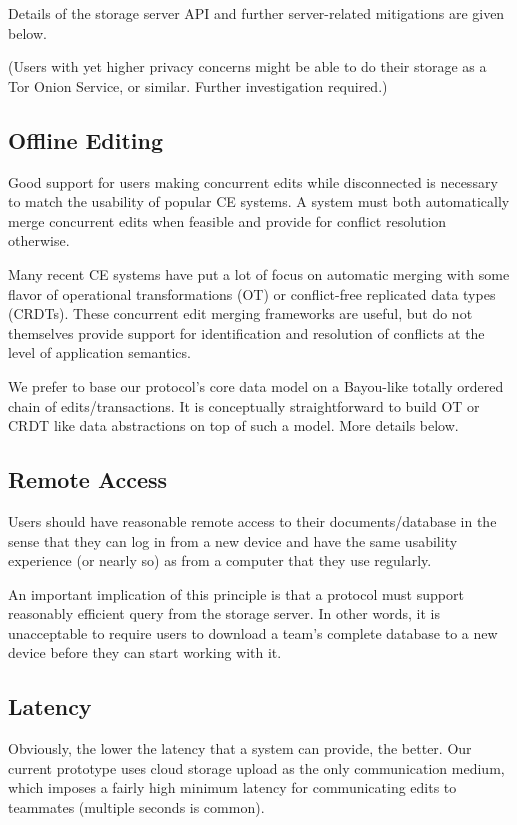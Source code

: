 \documentclass{article}
\begin{document}
Details of the storage server API and further server-related mitigations are given below.

(Users with yet higher privacy concerns might be able to do their storage as a Tor Onion Service, or similar.
Further investigation required.)

\subsection{Offline Editing}

Good support for users making concurrent edits while disconnected is necessary to match the usability of popular CE systems.
A system must both automatically merge concurrent edits when feasible and provide for conflict resolution otherwise.

Many recent CE systems have put a lot of focus on automatic merging with some flavor of operational transformations (OT) or conflict-free replicated data types (CRDTs).
These concurrent edit merging frameworks are useful, but do not themselves provide support for identification and resolution of conflicts at the level of application semantics.

We prefer to base our protocol's core data model on a Bayou-like totally ordered chain of edits/transactions.
It is conceptually straightforward to build OT or CRDT like data abstractions on top of such a model.
More details below.

\subsection{Remote Access}

Users should have reasonable remote access to their documents/database in the sense that they can log in from a new device and have the same usability experience (or nearly so) as from a computer that they use regularly.

An important implication of this principle is that a protocol must support reasonably efficient query from the storage server.
In other words, it is unacceptable to require users to download a team's complete database to a new device before they can start working with it.

\subsection{Latency}

Obviously, the lower the latency that a system can provide, the better.
Our current prototype uses cloud storage upload as the only communication medium, which imposes a fairly high minimum latency for communicating edits to teammates (multiple seconds is common).
\end{document}
